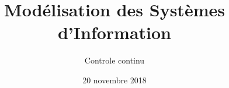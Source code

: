 \title{
    Modélisation des Systèmes d'Information
}
\author{
	Controle continu
}
\date{20 novembre 2018}
